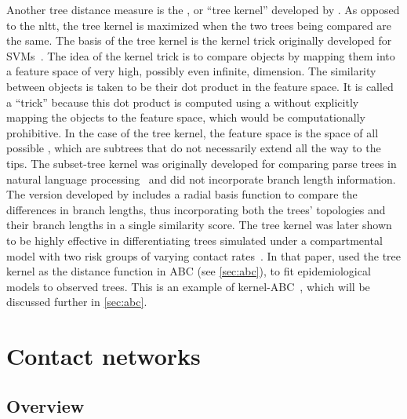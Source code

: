 Another tree distance measure is the , or ``tree
kernel'' developed by \textcite{poon2013mapping}. As opposed to the \gls{nltt},
the tree kernel is maximized when the two trees being compared are the same.
The basis of the tree kernel is the kernel trick originally developed for
\glspl{SVM}~\autocite{burges1998tutorial}. The idea of the kernel trick is to
compare objects by mapping them into a feature space of very high, possibly
even infinite, dimension. The similarity between objects is taken to be their
dot product in the feature space. It is called a ``trick'' because this dot
product is computed using a  without explicitly mapping
the objects to the feature space, which would be computationally prohibitive.
In the case of the tree kernel, the feature space is the space of all possible
, which are subtrees that do not necessarily extend all the
way to the tips. The subset-tree kernel was originally developed for comparing
parse trees in natural language processing~\autocite{collins2002new} and did
not incorporate branch length information. The version developed by
\textcite{poon2013mapping} includes a radial basis function to compare the
differences in branch lengths, thus incorporating both the trees' topologies
and their branch lengths in a single similarity score. The tree kernel was
later shown to be highly effective in differentiating trees simulated under a
compartmental model with two risk groups of varying contact
rates~\autocite{poon2015phylodynamic}. In that paper,
\citeauthor{poon2015phylodynamic} used the tree kernel as the distance function
in \gls{ABC} (see \cref{sec:abc}), to fit epidemiological models to observed
trees. This is an example of kernel-ABC~\autocite{nakagome2013kernel}, which
will be discussed further in \cref{sec:abc}.

\section{Contact networks}
\label{sec:contactnet}

\subsection{Overview}
\label{subsec:netoverview}

